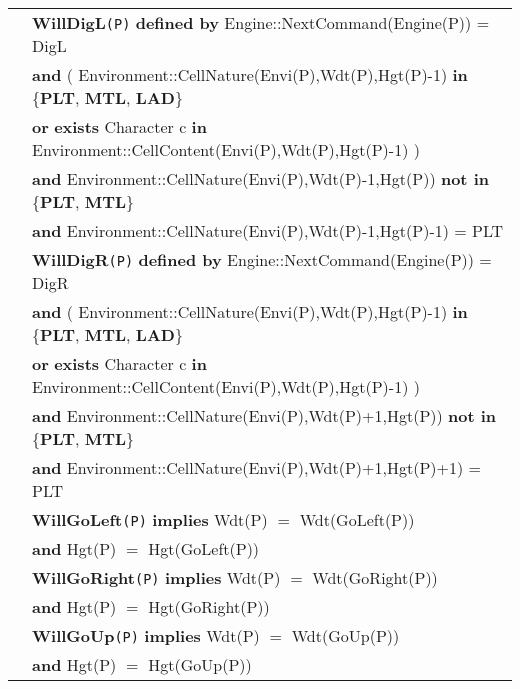\documentclass{article}
\begin{document}
\begin{tabular}{rl}
&\textbf{WillDigL}\texttt{(P)} \textbf{defined by}  \textrm{Engine::NextCommand(Engine(P))  = DigL}\\
& \quad \textbf{and} ( \textrm{Environment::CellNature(Envi(P),Wdt(P),Hgt(P)-1)} \textbf{in} \{\textbf{PLT}, \textbf{MTL}, \textbf{LAD}\} \\
& \quad\quad\quad\quad \textbf{or} \textbf{exists} \textrm{Character} c \textbf{in} \textrm{Environment::CellContent(Envi(P),Wdt(P),Hgt(P)-1)} ) \\
& \quad \textbf{and} \textrm{Environment::CellNature(Envi(P),Wdt(P)-1,Hgt(P))} \textbf{not in} \{\textbf{PLT}, \textbf{MTL}\} \\
& \quad \textbf{and} \textrm{Environment::CellNature(Envi(P),Wdt(P)-1,Hgt(P)-1)} = \textrm{PLT} \\

&\textbf{WillDigR}\texttt{(P)} \textbf{defined by}  \textrm{Engine::NextCommand(Engine(P))  = DigR}\\
& \quad \textbf{and} ( \textrm{Environment::CellNature(Envi(P),Wdt(P),Hgt(P)-1)} \textbf{in} \{\textbf{PLT}, \textbf{MTL}, \textbf{LAD}\} \\
& \quad\quad\quad\quad \textbf{or} \textbf{exists} \textrm{Character} c \textbf{in} \textrm{Environment::CellContent(Envi(P),Wdt(P),Hgt(P)-1)} ) \\
& \quad \textbf{and} \textrm{Environment::CellNature(Envi(P),Wdt(P)+1,Hgt(P))} \textbf{not in} \{\textbf{PLT}, \textbf{MTL}\} \\
& \quad \textbf{and} \textrm{Environment::CellNature(Envi(P),Wdt(P)+1,Hgt(P)+1)} = \textrm{PLT} \\

& \textbf{WillGoLeft}\texttt{(P)}  \textbf{implies}  \textrm{Wdt(P)} $=$ \textrm{Wdt(GoLeft(P))}\\ 
& \quad \textbf{and} \textrm{Hgt(P)} $=$ \textrm{Hgt(GoLeft(P))}\\

& \textbf{WillGoRight}\texttt{(P)}  \textbf{implies} \textrm{Wdt(P)} $=$ \textrm{Wdt(GoRight(P))}\\ 
& \quad \textbf{and} \textrm{Hgt(P)} $=$ \textrm{Hgt(GoRight(P))}\\

& \textbf{WillGoUp}\texttt{(P)}  \textbf{implies}  \textrm{Wdt(P)} $=$ \textrm{Wdt(GoUp(P))}\\ 
& \quad \textbf{and} \textrm{Hgt(P)} $=$ \textrm{Hgt(GoUp(P))}\\


\end{tabular}
\end{document}
